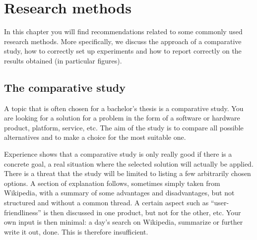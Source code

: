 \chapter{Research methods}
\label{ch:researchmethods}

In this chapter you will find recommendations related to some commonly used research methods. More specifically, we discuss the approach of a comparative study, how to correctly set up experiments and how to report correctly on the results obtained (in particular figures).

%
%

\section{The comparative study}
\label{sec:comparativestudy}

A topic that is often chosen for a bachelor's thesis is a comparative study. You are looking for a solution for a problem in the form of a software or hardware product, platform, service, etc. The aim of the study is to compare all possible alternatives and to make a choice for the most suitable one.

Experience shows that a comparative study is only really good if there is a concrete goal, a real situation where the selected solution will actually be applied. There is a threat that the study will be limited to listing a few arbitrarily chosen options. A section of explanation follows, sometimes simply taken from Wikipedia, with a summary of some advantages and disadvantages, but not structured and without a common thread. A certain aspect such as ``user-friendliness'' is then discussed in one product, but not for the other, etc. Your own input is then minimal: a day's search on Wikipedia, summarize or further write it out, done. This is therefore insufficient.

